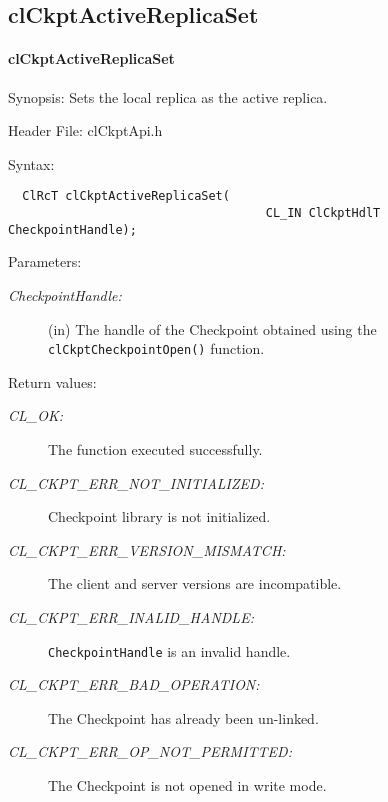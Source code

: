 \begin{flushleft}
\subsection{clCkptActiveReplicaSet}
\hypertarget{pageckpt108}{}\paragraph{cl\-Ckpt\-Active\-Replica\-Set}\label{pageckpt108}
\begin{Desc}
\item[Synopsis:]Sets the local replica as the active replica.\end{Desc}
\begin{Desc}
\item[Header File:]clCkptApi.h\end{Desc}
\begin{Desc}
\item[Syntax:]

\footnotesize\begin{verbatim}  ClRcT clCkptActiveReplicaSet(
                              		CL_IN ClCkptHdlT CheckpointHandle);
\end{verbatim}
\normalsize
\end{Desc}
\begin{Desc}
\item[Parameters:]
\begin{description}
\item[{\em Checkpoint\-Handle:}](in) The handle of the Checkpoint obtained using the {\tt{clCkptCheckpointOpen()}}
function.
\end{description}
\end{Desc}
\begin{Desc}
\item[Return values:]
\begin{description}
\item[{\em CL\_\-OK:}]The function executed successfully.
\item[{\em CL\_\-CKPT\_\-ERR\_\-NOT\_\-INITIALIZED:}]Checkpoint library is not initialized. 
\item[{\em CL\_\-CKPT\_\-ERR\_\-VERSION\_\-MISMATCH:}]The client and server versions are incompatible.
\item[{\em CL\_\-CKPT\_\-ERR\_\-INALID\_\-HANDLE:}]{\tt{CheckpointHandle}} is an invalid handle.
\item[{\em CL\_\-CKPT\_\-ERR\_\-BAD\_\-OPERATION:}]The Checkpoint has already been un-linked.
\item[{\em CL\_\-CKPT\_\-ERR\_\-OP\_\-NOT\_\-PERMITTED:}] The Checkpoint is not opened in write mode.


\end{description}
\end{Desc}
\end{flushleft}
